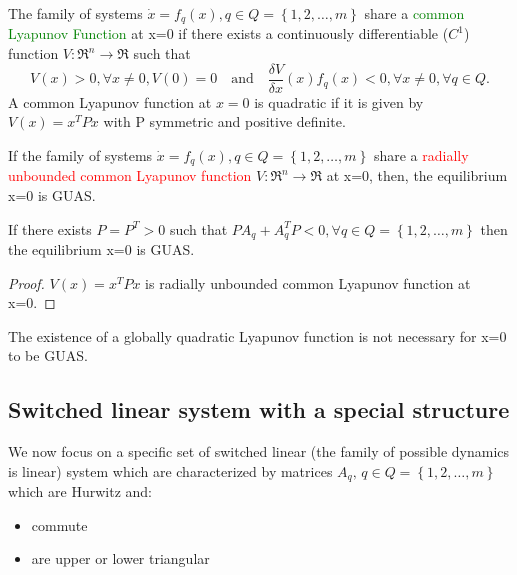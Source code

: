 \begin{defn}
	The family of systems $\dot{x}=f_q(x), q\in Q=\left\{1,2,\dots,m\right\}$ share a \textcolor{green}{common Lyapunov Function} at x=0 if there exists a continuously differentiable ($C^1$) function $V\colon\Re^n\to\Re$ such that \[
	 V(x)>0, \forall x \neq0, V(0)=0\quad \text{and} \quad \frac{\delta V}{\delta x}(x)f_q(x)<0, \forall x \neq0, \forall q \in Q
	 .\]
	 A common Lyapunov function at $x=0$ is quadratic if it is given by $V(x)=x^TPx$ with P symmetric and positive definite.
\end{defn}
\begin{thm}\label{lyap-th}
	If the family of systems $\dot{x}=f_q(x), q\in Q=\left\{1,2,\dots,m\right\}$ share a \textcolor{red}{radially unbounded common Lyapunov function} $V\colon\Re^n\to\Re$ at x=0, then, the equilibrium x=0 is GUAS.
\end{thm}
\begin{thm} \label{quad-lyap-th}
	If there exists $P=P^T>0$ such that $PA_q+A_q^TP<0, \forall q \in Q= \left\{1,2,\dots,m\right\}$ then the equilibrium x=0 is GUAS.
\end{thm}
\begin{proof}
	$V(x)=x^TPx$ is radially unbounded common Lyapunov function at x=0.
\end{proof}
\begin{remark}
	The existence of a globally quadratic Lyapunov function is not necessary for x=0 to be GUAS.
\end{remark}

\subsection{Switched linear system with a special structure}
We now focus on a specific set of switched linear (the family of possible dynamics is linear) system which are characterized by matrices $A_q,\,q\in Q=\left\{1,2,\dots,m\right\}$ which are Hurwitz and:
\begin{itemize}
	\item commute
	\item are upper or lower triangular
\end{itemize}
